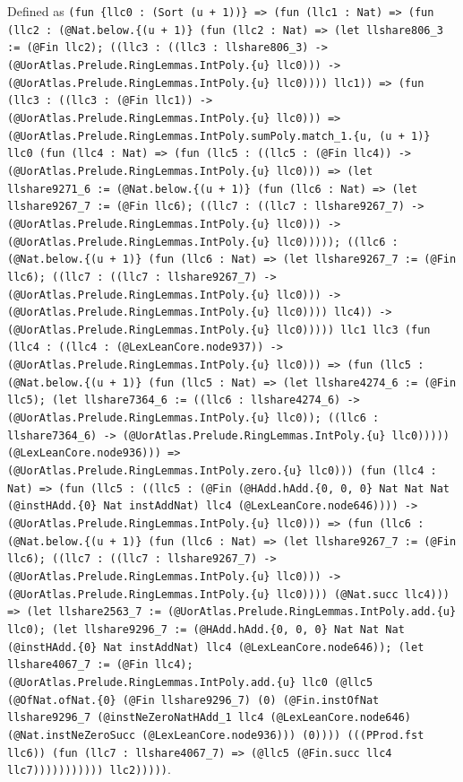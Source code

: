 \documentclass[11pt]{article}
\begin{document}
\noindent Defined as \texttt{(fun \{llc0 : (Sort (u + 1))\} => (fun (llc1 : Nat) => (fun (llc2 : (@Nat.below.\{(u + 1)\} (fun (llc2 : Nat) => (let llshare806\_3 := (@Fin llc2); ((llc3 : ((llc3 : llshare806\_3) -> (@UorAtlas.Prelude.RingLemmas.IntPoly.\{u\} llc0))) -> (@UorAtlas.Prelude.RingLemmas.IntPoly.\{u\} llc0)))) llc1)) => (fun (llc3 : ((llc3 : (@Fin llc1)) -> (@UorAtlas.Prelude.RingLemmas.IntPoly.\{u\} llc0))) => (@UorAtlas.Prelude.RingLemmas.IntPoly.sumPoly.match\_1.\{u, (u + 1)\} llc0 (fun (llc4 : Nat) => (fun (llc5 : ((llc5 : (@Fin llc4)) -> (@UorAtlas.Prelude.RingLemmas.IntPoly.\{u\} llc0))) => (let llshare9271\_6 := (@Nat.below.\{(u + 1)\} (fun (llc6 : Nat) => (let llshare9267\_7 := (@Fin llc6); ((llc7 : ((llc7 : llshare9267\_7) -> (@UorAtlas.Prelude.RingLemmas.IntPoly.\{u\} llc0))) -> (@UorAtlas.Prelude.RingLemmas.IntPoly.\{u\} llc0))))); ((llc6 : (@Nat.below.\{(u + 1)\} (fun (llc6 : Nat) => (let llshare9267\_7 := (@Fin llc6); ((llc7 : ((llc7 : llshare9267\_7) -> (@UorAtlas.Prelude.RingLemmas.IntPoly.\{u\} llc0))) -> (@UorAtlas.Prelude.RingLemmas.IntPoly.\{u\} llc0)))) llc4)) -> (@UorAtlas.Prelude.RingLemmas.IntPoly.\{u\} llc0))))) llc1 llc3 (fun (llc4 : ((llc4 : (@LexLeanCore.node937)) -> (@UorAtlas.Prelude.RingLemmas.IntPoly.\{u\} llc0))) => (fun (llc5 : (@Nat.below.\{(u + 1)\} (fun (llc5 : Nat) => (let llshare4274\_6 := (@Fin llc5); (let llshare7364\_6 := ((llc6 : llshare4274\_6) -> (@UorAtlas.Prelude.RingLemmas.IntPoly.\{u\} llc0)); ((llc6 : llshare7364\_6) -> (@UorAtlas.Prelude.RingLemmas.IntPoly.\{u\} llc0))))) (@LexLeanCore.node936))) => (@UorAtlas.Prelude.RingLemmas.IntPoly.zero.\{u\} llc0))) (fun (llc4 : Nat) => (fun (llc5 : ((llc5 : (@Fin (@HAdd.hAdd.\{0, 0, 0\} Nat Nat Nat (@instHAdd.\{0\} Nat instAddNat) llc4 (@LexLeanCore.node646)))) -> (@UorAtlas.Prelude.RingLemmas.IntPoly.\{u\} llc0))) => (fun (llc6 : (@Nat.below.\{(u + 1)\} (fun (llc6 : Nat) => (let llshare9267\_7 := (@Fin llc6); ((llc7 : ((llc7 : llshare9267\_7) -> (@UorAtlas.Prelude.RingLemmas.IntPoly.\{u\} llc0))) -> (@UorAtlas.Prelude.RingLemmas.IntPoly.\{u\} llc0)))) (@Nat.succ llc4))) => (let llshare2563\_7 := (@UorAtlas.Prelude.RingLemmas.IntPoly.add.\{u\} llc0); (let llshare9296\_7 := (@HAdd.hAdd.\{0, 0, 0\} Nat Nat Nat (@instHAdd.\{0\} Nat instAddNat) llc4 (@LexLeanCore.node646)); (let llshare4067\_7 := (@Fin llc4); (@UorAtlas.Prelude.RingLemmas.IntPoly.add.\{u\} llc0 (@llc5 (@OfNat.ofNat.\{0\} (@Fin llshare9296\_7) (0) (@Fin.instOfNat llshare9296\_7 (@instNeZeroNatHAdd\_1 llc4 (@LexLeanCore.node646) (@Nat.instNeZeroSucc (@LexLeanCore.node936))) (0)))) (((PProd.fst llc6)) (fun (llc7 : llshare4067\_7) => (@llc5 (@Fin.succ llc4 llc7))))))))))) llc2)))))}.\par
\end{document}
